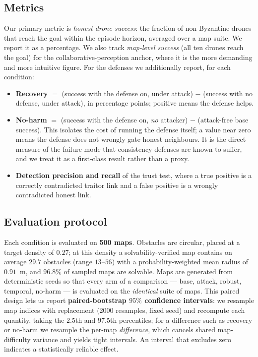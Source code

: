 
\subsection{Metrics}\label{sec:setup-metrics}
Our primary metric is \emph{honest-drone success}: the fraction of
non-Byzantine drones that reach the goal within the episode horizon,
averaged over a map suite. We report it as a percentage. We also track
\emph{map-level success} (all ten drones reach the goal) for the
collaborative-perception anchor, where it is the more demanding and more
intuitive figure. For the defenses we additionally report, for each
condition:
\begin{itemize}
\item \textbf{Recovery} $=$ (success with the defense on, under attack) $-$
(success with no defense, under attack), in percentage points; positive
means the defense helps.
\item \textbf{No-harm} $=$ (success with the defense on, \emph{no} attacker)
$-$ (attack-free base success). This isolates the cost of running the
defense itself; a value near zero means the defense does not wrongly gate
honest neighbours. It is the direct measure of the failure mode that
consistency defenses are known to suffer, and we treat it as a
first-class result rather than a proxy.
\item \textbf{Detection precision and recall} of the trust test, where a
true positive is a correctly contradicted traitor link and a false positive
is a wrongly contradicted honest link.
\end{itemize}

\subsection{Evaluation protocol}\label{sec:setup-protocol}
Each condition is evaluated on \textbf{500 maps}. Obstacles are circular,
placed at a target density of $0.27$; at this density a
solvability-verified map contains on average $29.7$ obstacles (range
$13$--$56$) with a probability-weighted mean radius of $0.91$~m, and
$96.8\%$ of sampled maps are solvable. Maps are generated from
deterministic seeds so that every arm of a comparison --- base, attack,
robust, temporal, no-harm --- is evaluated on the \emph{identical} suite of
maps. This paired design lets us report \textbf{paired-bootstrap $95\%$
confidence intervals}: we resample map indices with replacement (2000
resamples, fixed seed) and recompute each quantity, taking the $2.5$th and
$97.5$th percentiles; for a difference such as recovery or no-harm we
resample the per-map \emph{difference}, which cancels shared map-difficulty
variance and yields tight intervals. An interval that excludes zero
indicates a statistically reliable effect.

